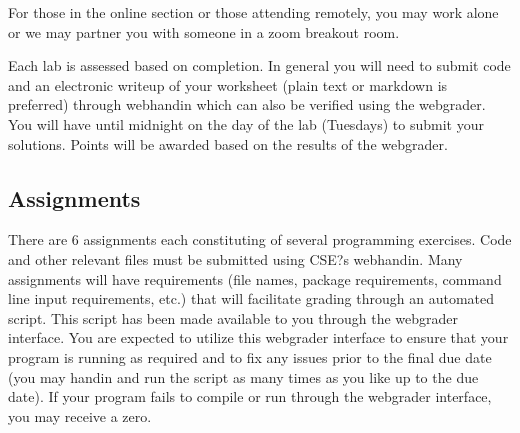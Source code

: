 \documentclass[12pt]{scrartcl}
\begin{document}
For those in the online section or those attending remotely, you 
may work alone or we may partner you with someone in a zoom 
breakout room.  

Each lab is assessed based on completion.  In general you will
need to submit code and an electronic writeup of your worksheet
(plain text or markdown is preferred) through webhandin which
can also be verified using the webgrader.  You will have until
midnight on the day of the lab (Tuesdays) to submit your solutions.
Points will be awarded based on the results of the webgrader.


%

\subsection{Assignments}

There are 6 assignments each constituting of several programming
exercises.  Code and other relevant files must be submitted using 
CSE?s webhandin.  Many assignments will have requirements (file 
names, package requirements, command line input requirements, 
etc.) that will facilitate grading through an automated script.  
This script has been made available to you through the webgrader 
interface.  You are expected to utilize this webgrader interface 
to ensure that your program is running as required and to fix any 
issues prior to the final due date (you may handin and run the 
script as many times as you like up to the due date).  If your 
program fails to compile or run through the webgrader interface, 
you may receive a zero.
\end{document}
